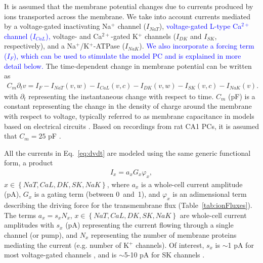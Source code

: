 \documentclass[10pt,letterpaper]{article}
\newcommand{\Ca}{Ca$^{2+}$}
\newcommand{\K}{K$^{+}$}
\newcommand{\Na}{Na$^{+}$}
\newcommand{\lrSet}[1]{\left\{#1\right\}}
\newcommand{\edit}[1]{\textcolor{blue}{#1}}
\begin{document}
It is assumed that the membrane potential changes due to currents produced by ions transported across the membrane. We take into account currents mediated by a voltage-gated inactivating {\Na} channel ($I_{NaT}$), \edit{voltage-gated L-type {\Ca} channel ($I_{CaL}$),} voltage- and {\Ca}-gated {\K} channels ($I_{DK}$ and $I_{SK}$, respectively), and a {\Na}/{\K}-ATPase ($I_{NaK}$). \edit{We also incorporate a forcing term ($I_F$), which can be used to stimulate the model PC and is explained in more detail below.} The time-dependent change in membrane potential can be written as
\begin{eqnarray}
\label{eq:dvdt}
C_m \partial_t v= I_{F} - I_{NaT}(v,w) - I_{CaL}(v,c) - I_{DK}(v,w) - I_{SK}(v,c) - I_{NaK}(v). 
\end{eqnarray}
with $\partial_t$ representing the instantaneous change with respect to time. $C_m$ (pF) is a constant representing the change in the density of charge around the membrane with respect to voltage, typically referred to as membrane capacitance in models based on electrical circuits  \cite{herrera2020nonequivalent}. Based on recordings from rat CA1 PCs, it is  assumed that $C_m=25$  pF \cite{groc2002vivo}.

All the currents in Eq.~\eqref{eq:dvdt} are modeled using the same generic functional form, a product
\begin{eqnarray}
    I_x = a_x G_x    \varphi_x, 
\end{eqnarray}
 $x \in \lrSet{NaT,CaL,DK,SK,NaK}$, where $a_x$ is a whole-cell current amplitude (pA), $G_x$ is a gating term (between 0~and~1), and $\varphi_x$ is an adimensional term describing the driving force for the transmembrane flux (Table~\ref{tab:ionFluxes}). The terms $a_x= s_x N_x$, $x \in \lrSet{NaT,CaL,DK,SK,NaK}$ are whole-cell current amplitudes with
$s_x$ (pA) representing the current flowing through a single channel (or pump), and $N_x$ representing the number of membrane proteins mediating the current (e.g. {number of {\K} channels}). Of interest, $s_x$ is $\sim$1 pA for most voltage-gated channels \cite{hille2001ion}, and is $\sim$5-10 pA for SK channels \cite{stocker20042+}.
\end{document}
